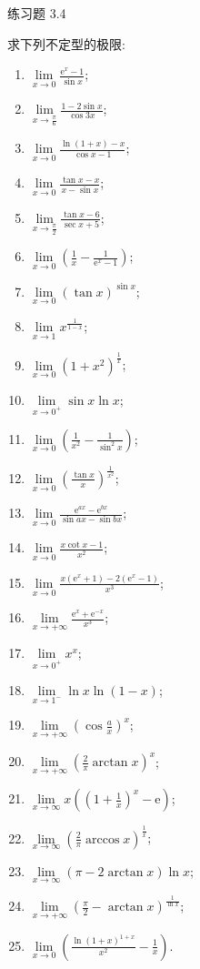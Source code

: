 \begin{exblock}{练习题 3.4}
  \item 求下列不定型的极限:
  \begin{enumerate}[label=(\arabic*)]
    \item $\lim\limits_{x\to0}\frac{\mathrm{e}^{x}-1}{\sin x}$;
    \item $\lim\limits_{x\to\frac{\pi}{6}}\frac{1-2\sin x}{\cos 3x}$;
    \item $\lim\limits_{x\to0}\frac{\ln(1+x)-x}{\cos x-1}$;
    \item $\lim\limits_{x\to0}\frac{\tan x-x}{x-\sin x}$;
    \item $\lim\limits_{x\to\frac{\pi}{2}}\frac{\tan x-6}{\sec x+5}$;
    \item $\lim\limits_{x\to0}\left(\frac{1}{x}-\frac{1}{\mathrm{e}^{x}-1}\right)$;
    \item $\lim\limits_{x\to0}(\tan x)^{\sin x}$;
    \item $\lim\limits_{x\to1}x^{\frac{1}{1-x}}$;
    \item $\lim\limits_{x\to0}(1+x^{2})^{\frac{1}{x}}$;
    \item $\lim\limits_{x\to0^{+}}\sin x\ln x$;
    \item $\lim\limits_{x\to0}\left(\frac{1}{x^{2}}-\frac{1}{\sin^{2}x}\right)$;
    \item $\lim\limits_{x\to0}\left(\frac{\tan x}{x}\right)^{\frac{1}{x^{2}}}$;
    \item $\lim\limits_{x\to0}\frac{\mathrm{e}^{ax}-\mathrm{e}^{bx}}{\sin ax-\sin bx}$;
    \item $\lim\limits_{x\to0}\frac{x\cot x-1}{x^{2}}$;
    \item $\lim\limits_{x\to0}\frac{x(\mathrm{e}^{x}+1)-2(\mathrm{e}^{x}-1)}{x^{3}}$;
    \item $\lim\limits_{x\to+\infty}\frac{\mathrm{e}^{x}+\mathrm{e}^{-x}}{x^{3}}$;
    \item $\lim\limits_{x\to0^{+}}x^{x}$;
    \item $\lim\limits_{x\to1^{-}}\ln x\ln(1-x)$;
    \item $\lim\limits_{x\to+\infty}\left(\cos\frac{a}{x}\right)^{x}$;
    \item $\lim\limits_{x\to+\infty}\left(\frac{2}{\pi}\arctan x\right)^{x}$;
    \item $\lim\limits_{x\to\infty}x\left(\left(1+\frac{1}{x}\right)^{x}-\mathrm{e}\right)$;
    \item $\lim\limits_{x\to\infty}\left(\frac{2}{\pi}\arccos x\right)^{\frac{1}{x}}$;
    \item $\lim\limits_{x\to\infty}(\pi-2\arctan x)\ln x$;
    \item $\lim\limits_{x\to+\infty}\left(\frac{\pi}{2}-\arctan x\right)^{\frac{1}{\ln x}}$;
    \item $\lim\limits_{x\to0}\left(\frac{\ln(1+x)^{1+x}}{x^{2}}-\frac{1}{x}\right)$.
  \end{enumerate}


\end{exblock}
